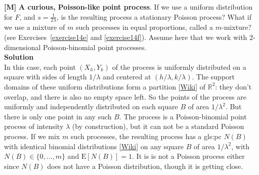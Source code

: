 \documentclass[10pt]{article}
\begin{document}
\begin{Exercise}\label{exerciseb1}
{\bf [M]}  {\bf A curious, Poisson-like point process}. If we use a uniform distribution for $F$, and $s=\frac{1}{2\lambda}$, is the resulting process a stationary Poisson process? What if we use a \textcolor{index}{mixture} of $m$ such processes in equal proportions, called a \textcolor{index}{$m$-mixture}? (see Exercises~\ref{exercise14e} and \ref{exercise14f}). Assume here that we work with 2-dimensional Poisson-binomial point processes.
 \vspace{1ex} \\
{\bf Solution} \vspace{1ex} \\
In this case, each point  $(X_h,Y_k)$ of the process is uniformly distributed on a square with sides of length $1/\lambda$ and centered at $(h/\lambda,k/\lambda)$.
The support domains of these uniform distributions form a 
\textcolor{index}{partition} [\href{https://en.wikipedia.org/wiki/Partition_of_a_set}{Wiki}] of $\mathbb{R}^2$: they don't overlap, and there is also no empty space left. So the points of the process are uniformly and independently 
distributed on each square $B$ of area $1/\lambda^2$. But there is only one point in any such $B$. 
The process is a Poisson-binomial point process of intensity $\lambda$ (by construction), but it can not be a standard Poisson process.  If we mix $m$ such
processes, the resulting process has a \gls{gls:pc} $N(B)$ with identical \textcolor{index}{binomial distributions} 
[\href{https://en.wikipedia.org/wiki/Binomial_distribution}{Wiki}] on any square $B$ of area $1/\lambda^2$,
 with $N(B)\in\{0,\dots,m\}$ and $\mbox{E}[N(B)]=1$.  It is is not a Poisson process either since $N(B)$ does not have a Poisson distribution, though it is getting close.
\end{Exercise}
\end{document}
